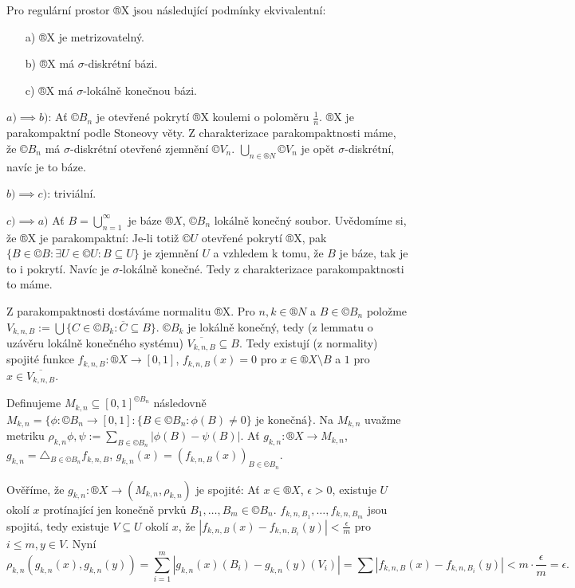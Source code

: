 \documentclass[12pt]{article}                   %
\begin{document}
    \begin{veta}
        Pro regulární prostor ®X jsou následující podmínky ekvivalentní:
        
        \begin{itemize}
            \item[a)] ®X je metrizovatelný.
            \item[b)] ®X má $\sigma$-diskrétní bázi.
            \item[c)] ®X má $\sigma$-lokálně konečnou bázi.
        \end{itemize}

        \begin{dukazin}
            $a) \implies b)$: Ať $©B_n$ je otevřené pokrytí ®X koulemi o poloměru $\frac{1}{n}$. ®X je parakompaktní podle Stoneovy věty. Z charakterizace parakompaktnosti máme, že $©B_n$ má $\sigma$-diskrétní otevřené zjemnění $©V_n$. $\bigcup_{n \in ®N} ©V_n$ je opět $\sigma$-diskrétní, navíc je to báze.

            $b) \implies c)$: triviální.

            $c) \implies a)$ Ať $B = \bigcup_{n=1}^∞$ je báze $®X$, $©B_n$ lokálně konečný soubor. Uvědomíme si, že ®X je parakompaktní: Je-li totiž $©U$ otevřené pokrytí ®X, pak $\{B \in ©B: \exists U \in ©U: B \subseteq U\}$ je zjemnění $U$ a vzhledem k tomu, že $B$ je báze, tak je to i pokrytí. Navíc je $\sigma$-lokálně konečné. Tedy z charakterizace parakompaktnosti to máme.

            Z parakompaktnosti dostáváme normalitu ®X. Pro $n, k \in ®N$ a $B \in ©B_n$ položme $V_{k, n, B}:= \bigcup\{C \in ©B_k: \overline{C} \subseteq B\}$. $©B_k$ je lokálně konečný, tedy (z lemmatu o uzávěru lokálně konečného systému) $\overline{V_{k, n , B}} \subseteq B$. Tedy existují (z normality) spojité funkce $f_{k, n, B}: ®X \rightarrow [0, 1]$, $f_{k, n, B}(x) = 0$ pro $x \in ®X \setminus B$ a $1$ pro $x \in \overline{V_{k, n, B}}$.

            Definujeme $M_{k, n} \subseteq [0, 1]^{©B_n}$ následovně $M_{k, n} = \{\phi: ©B_n \rightarrow [0, 1]: \{B \in ©B_n: \phi(B) ≠ 0\} \text{ je konečná}\}$. Na $M_{k, n}$ uvažme metriku $\rho_{k, n}{\phi, \psi} := \sum_{B \in ©B_n} |\phi(B) - \psi(B)|$. Ať $g_{k, n}: ®X \rightarrow M_{k, n}$, $g_{k, n} = \triangle_{B \in ©B_n} f_{k, n, B}$, $g_{k, n}(x) = (f_{k, n, B}(x))_{B \in ©B_n}$.

            Ověříme, že $g_{k, n}: ®X \rightarrow (M_{k, n}, \rho_{k, n})$ je spojité: Ať $x \in ®X$, $\epsilon > 0$, existuje $U$ okolí $x$ protínající jen konečně prvků $B_1, …, B_m \in ©B_n$. $f_{k, n, B_1}, …, f_{k, n, B_m}$ jsou spojitá, tedy existuje $V \subseteq U$ okolí $x$, že $|f_{k, n, B}(x) - f_{k, n, B_i}(y)| < \frac{\epsilon}{m}$ pro $i ≤ m, y \in V$. Nyní
            $$ \rho_{k, n}(g_{k, n}(x), g_{k, n}(y)) = \sum_{i=1}^m |g_{k, n}(x)(B_i) - g_{k, n}(y)(V_i)| = \sum |f_{k, n, B}(x) - f_{k, n, B_i}(y)| < m·\frac{\epsilon}{m} = \epsilon. $$


\end{dukazin}
\end{veta}
\end{document}
